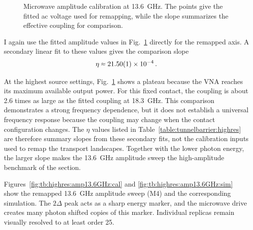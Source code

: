 
        \begin{figure}
            \captionsetup{format=plain}%
            \centering
            \vspace{-0.5em}
            \vspace{-0.5em}
            \caption{
                Microwave amplitude calibration at \qty{13.6}{\giga\hertz}. The points give the fitted ac voltage used for remapping, while the slope summarizes the effective coupling for comparison.
                }
            \label{fig:tb:highres:amp13.6GHz:fit}
        \end{figure}

        I again use the fitted amplitude values in Fig.~\ref{fig:tb:highres:amp13.6GHz:fit} directly for the remapped axis. A secondary linear fit to these values gives the comparison slope
        \begin{equation}
            \eta\sapprox21.50(1)\times10^{-4}\,.
            \label{eq:tb:highres:amp13.6GHz:eta}
        \end{equation}

        At the highest source settings, Fig.~\ref{fig:tb:highres:amp13.6GHz:fit} shows a plateau because the VNA reaches its maximum available output power. For this fixed contact, the coupling is about 2.6 times as large as the fitted coupling at \qty{18.3}{\giga\hertz}. This comparison demonstrates a strong frequency dependence, but it does not establish a universal frequency response because the coupling may change when the contact configuration changes. The $\eta$ values listed in Table~\ref{table:tunnelbarrier:highres} are therefore summary slopes from these secondary fits, not the calibration inputs used to remap the transport landscapes. Together with the lower photon energy, the larger slope makes the \qty{13.6}{\giga\hertz} amplitude sweep the high-amplitude benchmark of the section.

        Figures~\ref{fig:tb:highres:amp13.6GHz:cal} and \ref{fig:tb:highres:amp13.6GHz:sim} show the remapped \qty{13.6}{\giga\hertz} amplitude sweep (M4) and the corresponding simulation. The $2\Delta$ peak acts as a sharp energy marker, and the microwave drive creates many photon shifted copies of this marker. Individual replicas remain visually resolved to at least order 25.


